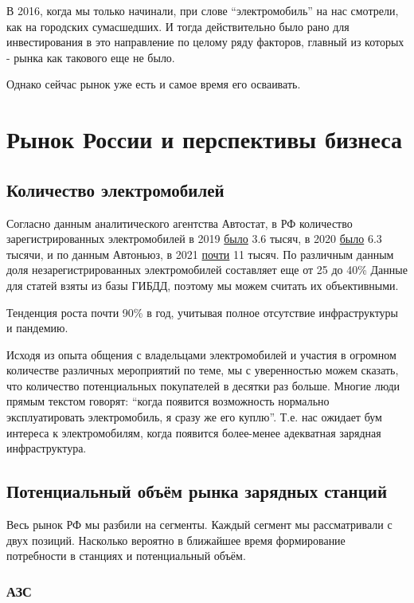 \documentclass[a4paper,12pt]{report}
\begin{document}
В 2016, когда мы только начинали, при слове “электромобиль” на нас смотрели, как на городских сумасшедших. И тогда действительно было рано для инвестирования в это направление по целому ряду факторов, главный из которых - рынка как такового еще не было. 

Однако сейчас рынок уже есть и самое время его осваивать.  


\chapter{Рынок России и перспективы бизнеса}

\section{Количество электромобилей}

Согласно данным аналитического агентства Автостат, в РФ количество зарегистрированных электромобилей в 2019 \href{https://www.autostat.ru/news/38371/}{было} 3.6 тысяч, в 2020 \href{https://www.autostat.ru/news/42999/}{было} 6.3 тысячи, и по данным Автоньюз, в 2021 \href{https://www.autonews.ru/news/602002889a7947acbb3fd189}{почти} 11 тысяч. По различным данным доля незарегистрированных электромобилей составляет еще от 25 до 40\% Данные для статей взяты из базы ГИБДД, поэтому мы можем считать их объективными. 

Тенденция роста почти 90\% в год, учитывая полное отсутствие инфраструктуры и пандемию.

Исходя из опыта общения с владельцами электромобилей и участия в огромном количестве различных мероприятий по теме, мы с уверенностью можем сказать, что количество потенциальных покупателей в десятки раз больше. Многие люди прямым текстом говорят: “когда появится возможность нормально эксплуатировать электромобиль, я сразу же его куплю”. Т.е. нас ожидает бум интереса к электромобилям, когда появится более-менее адекватная зарядная инфраструктура. 

\section{Потенциальный объём рынка зарядных станций}

Весь рынок РФ мы разбили на сегменты. Каждый сегмент мы рассматривали с двух позиций. Насколько вероятно в ближайшее время формирование потребности в станциях и потенциальный объём. 

\subsection{АЗС}
\end{document}
